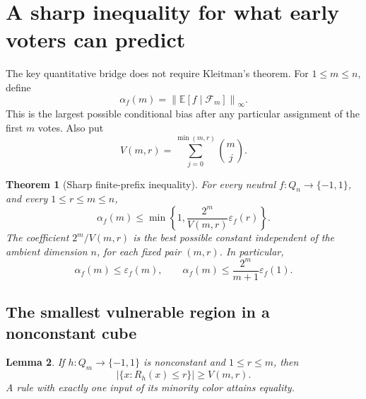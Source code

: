 \documentclass[11pt]{article}
\newtheorem{theorem}{Theorem}[section]
\newtheorem{lemma}[theorem]{Lemma}
\theoremstyle{definition}
\theoremstyle{remark}
\newcommand{\E}{\mathbb E}
\newcommand{\cF}{\mathcal F}
\newcommand{\eps}{\varepsilon}
\newcommand{\vol}{V}
\begin{document}
\section{A sharp inequality for what early voters can predict}
\label{rch:sec:prefix}

The key quantitative bridge does not require Kleitman's theorem. For
\(1\le m\le n\), define
\begin{equation}
 \alpha_f(m)=\left\|\E[f\mid\cF_m]\right\|_\infty.
 \label{rch:eq:alpha}
\end{equation}
This is the largest possible conditional bias after any particular assignment
of the first \(m\) votes. Also put
\begin{equation}
 \vol(m,r)=\sum_{j=0}^{\min(m,r)}\binom mj.
 \label{rch:eq:volume}
\end{equation}

\begin{theorem}[Sharp finite-prefix inequality]
\label{rch:thm:prefix}
For every neutral \(f:Q_n\to\{-1,1\}\), and every
\(1\le r\le m\le n\),
\begin{equation}
 \boxed{\quad
 \alpha_f(m)\le
 \min\left\{1,\frac{2^m}{\vol(m,r)}\eps_f(r)\right\}.
 \quad}
 \label{rch:eq:sharpalpha}
\end{equation}
The coefficient \(2^m/\vol(m,r)\) is the best possible constant independent
of the ambient dimension \(n\), for each fixed pair \((m,r)\).
In particular,
\begin{equation}
 \alpha_f(m)\le\eps_f(m),\qquad
 \alpha_f(m)\le\frac{2^m}{m+1}\eps_f(1).
 \label{rch:eq:alphaspecial}
\end{equation}
\end{theorem}

\subsection{The smallest vulnerable region in a nonconstant cube}

\begin{lemma}
\label{rch:lem:minboundary}
If \(h:Q_m\to\{-1,1\}\) is nonconstant and \(1\le r\le m\), then
\begin{equation}
 |\{x:R_h(x)\le r\}|\ge\vol(m,r).
 \label{rch:eq:minboundary}
\end{equation}
A rule with exactly one input of its minority color attains equality.
\end{lemma}
\end{document}
